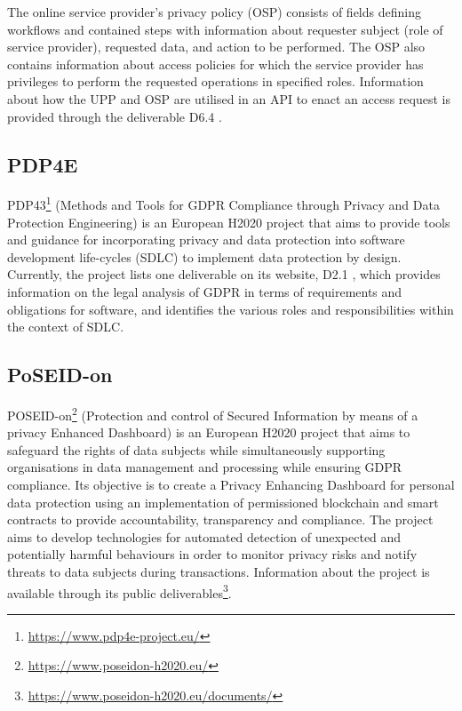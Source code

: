 The online service provider's privacy policy (OSP) \cite{noauthor_d6.7finalproductversionofsecurityawaretoolsv1.0_77_378.pdf_nodate} consists of fields defining workflows and contained steps with information about requester subject (role of service provider), requested data, and action to be performed. The OSP also contains information about access policies for which the service provider has privileges to perform the requested operations in specified roles. Information about how the UPP and OSP are utilised in an API to enact an access request is provided through the deliverable D6.4 \cite{noauthor_d6.4finalproductversionofprivacyenhancedtoolsv1.0_77_366.pdf_nodate}.

\subsection{PDP4E}
PDP43\footnote{\url{https://www.pdp4e-project.eu/}} (Methods and Tools for GDPR Compliance through Privacy and Data Protection Engineering) is an European H2020 project that aims to provide tools and guidance for incorporating privacy and data protection into software development life-cycles (SDLC) to implement data protection by design. Currently, the project lists one deliverable on its website, D2.1 \cite{noauthor_pdp4e-d2.1_multistakeholder_nodate}, which provides information on the legal analysis of GDPR in terms of requirements and obligations for software, and identifies the various roles and responsibilities within the context of SDLC. 


\subsection{PoSEID-on}
POSEID-on\footnote{\url{https://www.poseidon-h2020.eu/}} (Protection and control of Secured Information by means of a privacy Enhanced Dashboard) is an European H2020 project that aims to safeguard the rights of data subjects
while simultaneously supporting organisations in data management and processing while ensuring GDPR compliance.
Its objective is to create a Privacy Enhancing Dashboard for personal data protection using an implementation of permissioned blockchain and smart contracts to provide accountability, transparency and compliance.
The project aims to develop technologies for automated detection of unexpected and potentially harmful behaviours in order to monitor privacy risks and notify threats to data subjects during transactions.
Information about the project is available through its public deliverables\footnote{\url{https://www.poseidon-h2020.eu/documents/}}.

